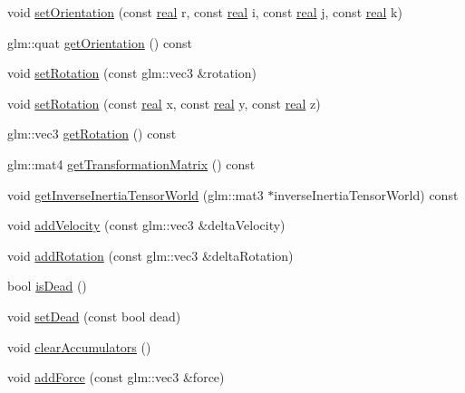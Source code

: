 \begin{DoxyCompactItemize}
void \hyperlink{classrum_1_1_rigid_body_a10978d0759ab1cbe0e63a3143d4141b8}{set\+Orientation} (const \hyperlink{namespacerum_a7e8cca23573d5eaead0f138cbaa4862c}{real} r, const \hyperlink{namespacerum_a7e8cca23573d5eaead0f138cbaa4862c}{real} i, const \hyperlink{namespacerum_a7e8cca23573d5eaead0f138cbaa4862c}{real} j, const \hyperlink{namespacerum_a7e8cca23573d5eaead0f138cbaa4862c}{real} k)
\item 
glm\+::quat \hyperlink{classrum_1_1_rigid_body_a333d4b85e26497a8939faa1d0048d131}{get\+Orientation} () const
\item 
void \hyperlink{classrum_1_1_rigid_body_aa6b6e73db8fefb0a54d82cf245b6bda6}{set\+Rotation} (const glm\+::vec3 \&rotation)
\item 
void \hyperlink{classrum_1_1_rigid_body_aa0156ccce8351de3e869dd19117e014a}{set\+Rotation} (const \hyperlink{namespacerum_a7e8cca23573d5eaead0f138cbaa4862c}{real} x, const \hyperlink{namespacerum_a7e8cca23573d5eaead0f138cbaa4862c}{real} y, const \hyperlink{namespacerum_a7e8cca23573d5eaead0f138cbaa4862c}{real} z)
\item 
glm\+::vec3 \hyperlink{classrum_1_1_rigid_body_aa99998dba8c818290cfba8dacccd66a2}{get\+Rotation} () const
\item 
glm\+::mat4 \hyperlink{classrum_1_1_rigid_body_a5e289b46c1849f186295d7f3cdef113d}{get\+Transformation\+Matrix} () const
\item 
void \hyperlink{classrum_1_1_rigid_body_a1bef6c65c76a64c0a7ea8ebff4cd5c58}{get\+Inverse\+Inertia\+Tensor\+World} (glm\+::mat3 $\ast$inverse\+Inertia\+Tensor\+World) const
\item 
void \hyperlink{classrum_1_1_rigid_body_a347acf72fd3aa739218025050713948a}{add\+Velocity} (const glm\+::vec3 \&delta\+Velocity)
\item 
void \hyperlink{classrum_1_1_rigid_body_a8d3625960b75bdf71c205274896d1969}{add\+Rotation} (const glm\+::vec3 \&delta\+Rotation)
\item 
bool \hyperlink{classrum_1_1_rigid_body_a8864878e784f5cc50993ed2470b03cb3}{is\+Dead} ()
\item 
void \hyperlink{classrum_1_1_rigid_body_a253cfde1f35c821afcfef39ecf237428}{set\+Dead} (const bool dead)
\item 
void \hyperlink{classrum_1_1_rigid_body_ae6048d852853ae37ebc9301b430ad021}{clear\+Accumulators} ()
\item 
void \hyperlink{classrum_1_1_rigid_body_a82678048704e31e6781d107c89094706}{add\+Force} (const glm\+::vec3 \&force)
\item 

\end{DoxyCompactItemize}
